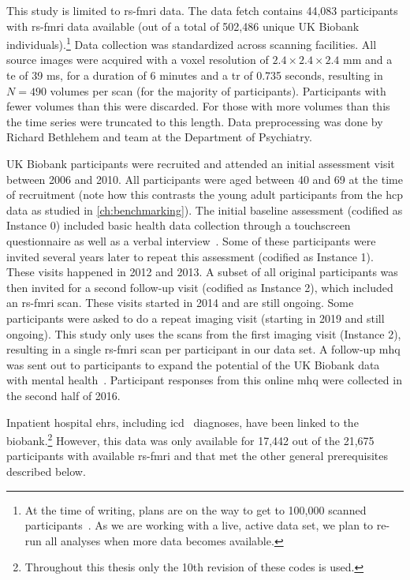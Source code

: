 This study is limited to \gls{rs-fmri} data.
The data fetch contains 44,083 participants with \gls{rs-fmri} data available (out of a total of 502,486 unique UK Biobank individuals).\footnote{At the time of writing, plans are on the way to get to 100,000 scanned participants~\parencite{Littlejohns2020}. As we are working with a live, active data set, we plan to re-run all analyses when more data becomes available.}
Data collection was standardized across scanning facilities.
All source images were acquired with a voxel resolution of $2.4 \times 2.4 \times 2.4$ mm and a \gls{te} of 39 ms, for a duration of 6 minutes and a \gls{tr} of 0.735 seconds, resulting in $N = 490$ volumes per scan (for the majority of participants).
Participants with fewer volumes than this were discarded.
For those with more volumes than this the time series were truncated to this length.
Data preprocessing was done by Richard Bethlehem and team at the Department of Psychiatry.

UK Biobank participants were recruited and attended an initial assessment visit between 2006 and 2010.
All participants were aged between 40 and 69 at the time of recruitment (note how this contrasts the young adult participants from the \gls{hcp} data as studied in \cref{ch:benchmarking}).
The initial baseline assessment (codified as Instance 0) included basic health data collection through a touchscreen questionnaire as well as a verbal interview~\parencite{Bycroft2018}.
%
Some of these participants were invited several years later to repeat this assessment (codified as Instance 1).
These visits happened in 2012 and 2013.
%
A subset of all original participants was then invited for a second follow-up visit (codified as Instance 2), which included an \gls{rs-fmri} scan.
These visits started in 2014 and are still ongoing.
%
Some participants were asked to do a repeat imaging visit (starting in 2019 and still ongoing).
%
This study only uses the scans from the first imaging visit (Instance 2), resulting in a single \gls{rs-fmri} scan per participant in our data set.
A follow-up \gls{mhq} was sent out to participants to expand the potential of the UK Biobank data with mental health~\parencite{Davis2020, Glanville2021}.
Participant responses from this online \gls{mhq} were collected in the second half of 2016.

Inpatient hospital \glspl{ehr}, including \gls{icd}~\parencite{WHO1992} diagnoses, have been linked to the biobank.\footnote{Throughout this thesis only the 10th revision of these codes is used.}
However, this data was only available for 17,442 out of the 21,675 participants with available \gls{rs-fmri} and that met the other general prerequisites described below.

